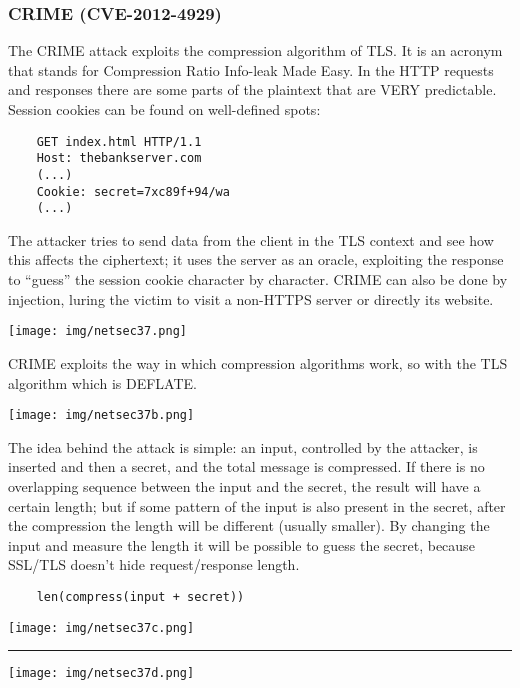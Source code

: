 \documentclass[a4paper, 10pt, titlepage]{article}
\begin{document}
\subsubsection{CRIME (CVE-2012-4929)}
The CRIME attack exploits the compression algorithm of TLS. It is an acronym that stands for Compression Ratio Info-leak Made Easy. In the HTTP requests and responses there are some parts of the plaintext that are VERY predictable. Session cookies can be found on well-defined spots:
\begin{lstlisting}
	GET index.html HTTP/1.1
	Host: thebankserver.com
	(...)
	Cookie: secret=7xc89f+94/wa
	(...)
\end{lstlisting}
The attacker tries to send data from the client in the TLS context and see how this affects the ciphertext; it uses the server as an oracle, exploiting the response to “guess” the session cookie character by character. CRIME can also be done by injection, luring the victim to visit a non-HTTPS server or directly its website.
\begin{center}
	\texttt{[image: img/netsec37.png]}
\end{center}
CRIME exploits the way in which compression algorithms work, so with the TLS algorithm which is DEFLATE.
\begin{center}
	\texttt{[image: img/netsec37b.png]}
\end{center}
The idea behind the attack is simple: an input, controlled by the attacker, is inserted and then a secret, and the total message is compressed. If there is no overlapping sequence between the input and the secret, the result will have a certain length; but if some pattern of the input is also present in the secret, after the compression the length will be different (usually smaller). By changing the input and measure the length it will be possible to guess the secret, because SSL/TLS doesn't hide request/response length.
\begin{lstlisting}
	len(compress(input + secret))
\end{lstlisting}
\begin{center}
	\texttt{[image: img/netsec37c.png]}
\end{center}

\begin{center}
	\noindent\rule{8cm}{0.4pt}
\end{center}

\begin{center}
	\texttt{[image: img/netsec37d.png]}
\end{center}
\end{document}
